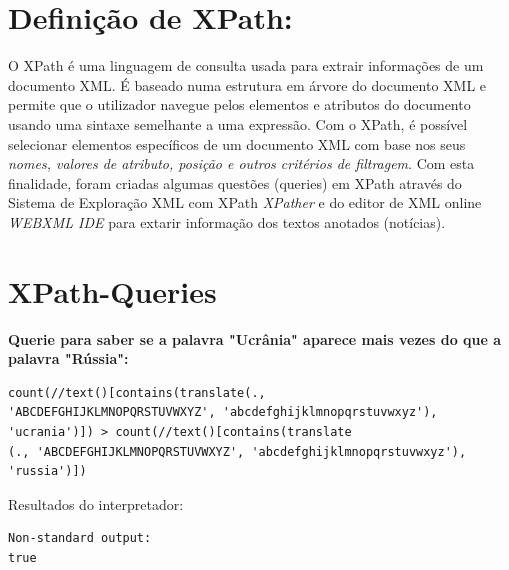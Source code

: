 \documentclass[12pt]{report}
\begin{document}
\section{Definição de XPath:}
O XPath é uma linguagem de consulta usada para extrair informações de um documento XML. É baseado numa estrutura em árvore do documento XML e permite que o utilizador navegue pelos elementos e atributos do documento usando uma sintaxe semelhante a uma expressão. Com o XPath, é possível selecionar elementos específicos de um documento XML com base nos seus \textit{nomes, valores de atributo, posição e outros critérios de filtragem}. Com esta finalidade, foram criadas algumas questões (queries) em XPath através do Sistema de Exploração XML com XPath \textit{XPather} e do editor de XML online \textit{WEBXML IDE} para extarir informação dos textos anotados (notícias).
\section{XPath-Queries}

\textbf{Querie para saber se a palavra "Ucrânia" aparece mais vezes do que a palavra "Rússia":}
\begin{verbatim}
count(//text()[contains(translate(.,
'ABCDEFGHIJKLMNOPQRSTUVWXYZ', 'abcdefghijklmnopqrstuvwxyz'),
'ucrania')]) > count(//text()[contains(translate
(., 'ABCDEFGHIJKLMNOPQRSTUVWXYZ', 'abcdefghijklmnopqrstuvwxyz'), 
'russia')])
\end{verbatim}
Resultados do interpretador:
\begin{lstlisting}[language=XML, breaklines=true, basicstyle=\fontsize{12}{14}\selectfont]
Non-standard output:
true
\end{lstlisting}
\end{document}
